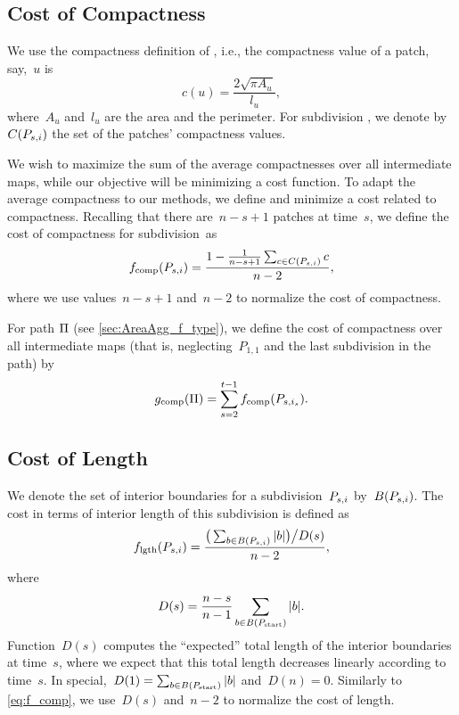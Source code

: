 \subsection{Cost of Compactness}
\label{sec:AreaAgg_f_comp}

We use the compactness definition of \citet{Frolov1975}, 
i.e., the compactness value of a patch, say,~$u$ is
\begin{equation*}
\label{eq:comp}
c(u)=\frac{2 \sqrt{\pi A_u}}{l_u},
\end{equation*}
where~$A_u$ and~$l_u$ are 
the area and the perimeter. 
For subdivision \Psnode, we denote by~$C(P_{s,i})$ 
the set of the patches' compactness values.

We wish to maximize the sum of the average compactnesses 
over all intermediate maps,
while our objective will be
minimizing a cost function.
To adapt the average compactness to our methods, 
we define and minimize a cost related to compactness.
Recalling that there are~$n-s+1$ patches at time~$s$,
we define the cost of compactness for subdivision~\Psnode as
\begin{equation}
\label{eq:f_comp}
f_{\mathrm{comp}}(P_{s,i})=
\frac{1-\frac{1}{n-s+1} \sum_{c\in C(P_{s,i})}c}{n-2},
\end{equation}
where we use values~$n-s+1$ and~$n-2$ to normalize 
the cost of compactness.

For path $\Pi$ (see \sect\ref{sec:AreaAgg_f_type}),  
we define the cost of compactness over all 
intermediate maps
(that is, neglecting~$P_{1,1}$ 
and the last subdivision in the path) by
\begin{equation}
\label{eq:g_comp}
g_\mathrm{comp}(\Pi)=
\sum_{s=2}^{t-1}f_{\mathrm{comp}}(P_{s,i_s}).
\end{equation}


\subsection{Cost of Length}
\label{sec:AreaAgg_costlength}

We denote the set of interior boundaries 
for a subdivision~$P_{s,i}$ by~$B(P_{s,i})$.
The cost in terms of interior length of 
this subdivision is defined as
\begin{equation}
\label{eq:f_length}
f_{\mathrm{lgth}}(P_{s,i})=
\frac{\big(\sum_{b\in B (P_{s,i})} 
	|b|\big)\big/D(s)}{n-2}, 
\end{equation} 
where 
\begin{equation}
\label{eq:AreaAgg_Norm}
D(s)=\frac{n-s}{n-1} \sum_{b\in B (P_\mathrm{start})} |b|.
\end{equation}
Function~$D(s)$ computes the ``expected'' total length of 
the interior boundaries at time~$s$,
where we expect that this total length decreases linearly
according to time~$s$.
In special,~$D(1) = \sum_{b\in B (P_\mathrm{start})} |b|$
and~$D(n) = 0$.
Similarly to \eq\ref{eq:f_comp}, 
we use~$D(s)$ and~$n-2$ to normalize 
the cost of length.


